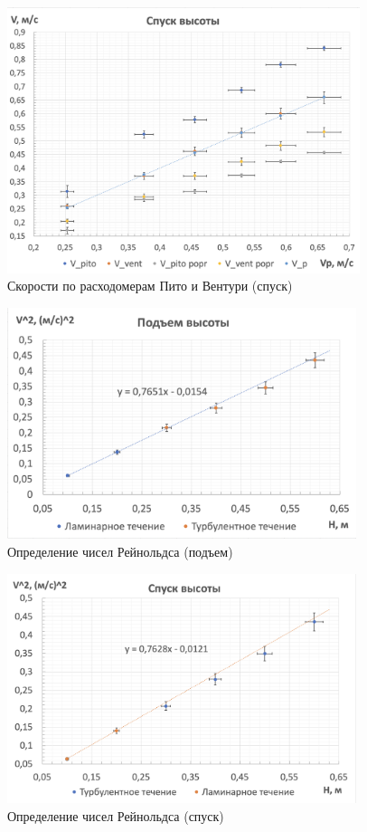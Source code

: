 \documentclass[a4paper, 12pt]{article}
\begin{document}
\begin{center}
\begin{figure}[h!]
        \includegraphics[width=0.92\textwidth]{graph4.png}
        \caption{Скорости по расходомерам Пито и Вентури (спуск)}
        \label{ris:ustanovka}
    \end{figure}
    
\begin{figure}[h!]
        \includegraphics[width=0.91\textwidth]{graph5.png}
        \caption{Определение чисел Рейнольдса (подъем)}
        \label{ris:ustanovka}
    \end{figure}


\begin{figure}[h!]
        \includegraphics[width=0.91\textwidth]{graph6.png}
        \caption{Определение чисел Рейнольдса (спуск)}
        \label{ris:ustanovka}
    \end{figure}
\end{center}
\end{document}
